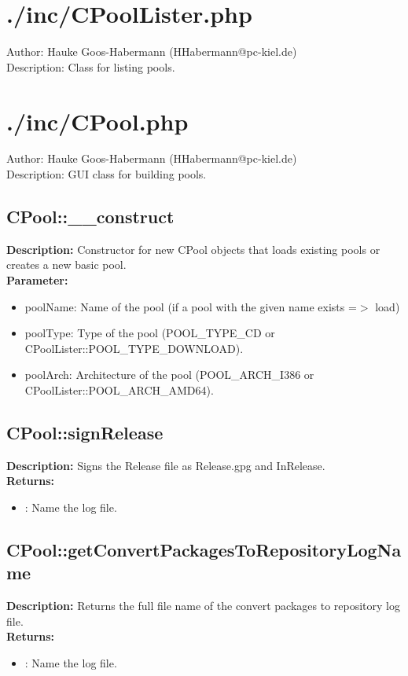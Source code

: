 \newpage\section{./inc/CPoolLister.php}
 Author: Hauke Goos-Habermann (HHabermann@pc-kiel.de)\\
 Description: Class for listing pools.\\

\newpage\section{./inc/CPool.php}
 Author: Hauke Goos-Habermann (HHabermann@pc-kiel.de)\\
 Description: GUI class for building pools.\\

\subsection{CPool::\_\_construct}
\textbf{Description:} Constructor for new CPool objects that loads existing pools or creates a new basic pool.\\
\textbf{Parameter:}
\begin{itemize}
\item poolName: Name of the pool (if a pool with the given name exists =$>$ load)
\item poolType: Type of the pool (POOL\_TYPE\_CD or CPoolLister::POOL\_TYPE\_DOWNLOAD).
\item poolArch: Architecture of the pool (POOL\_ARCH\_I386 or CPoolLister::POOL\_ARCH\_AMD64).
\end{itemize}

\subsection{CPool::signRelease}
\textbf{Description:} Signs the Release file as Release.gpg and InRelease.\\
\textbf{Returns:}
\begin{itemize}
\item : Name the log file.
\end{itemize}

\subsection{CPool::getConvertPackagesToRepositoryLogName}
\textbf{Description:} Returns the full file name of the convert packages to repository log file.\\
\textbf{Returns:}
\begin{itemize}
\item : Name the log file.
\end{itemize}

